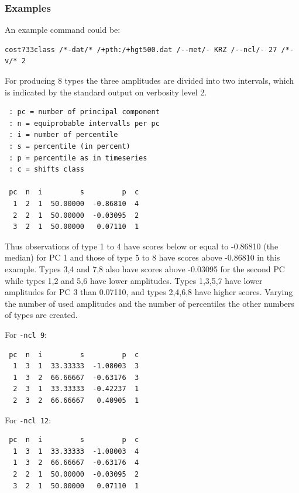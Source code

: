 \documentclass[12pt, oneside, a4paper, headsepline, plainheadsepline]{scrbook}
\begin{document}
\subsubsection*{Examples}
An example command could be:
\begin{lstlisting}
cost733class /*-dat/* /+pth:/+hgt500.dat /--met/- KRZ /--ncl/- 27 /*-v/* 2
\end{lstlisting}

For producing 8 types the three amplitudes are divided into two intervals, which is indicated by the 
standard output on verbosity level 2.

\begin{scriptsize}
\begin{lstlisting}
 : pc = number of principal component
 : n = equiprobable intervalls per pc
 : i = number of percentile
 : s = percentile (in percent)
 : p = percentile as in timeseries
 : c = shifts class

 pc  n  i         s         p  c
  1  2  1  50.00000  -0.86810  4
  2  2  1  50.00000  -0.03095  2
  3  2  1  50.00000   0.07110  1
\end{lstlisting}
\end{scriptsize}

Thus observations of type 1 to 4 have scores below or equal to -0.86810 (the median) for PC 1 and those of type 5 to 8
have scores above -0.86810 in this example. Types 3,4 and 7,8 also have scores above -0.03095 for the second PC 
while types 1,2 and 5,6 have lower amplitudes. Types 1,3,5,7 have lower amplitudes for PC 3 than 0.07110, and
types 2,4,6,8 have higher scores.
Varying the number of used amplitudes and the number of percentiles the other numbers of types are created.

For \verb+-ncl 9+:
\begin{scriptsize}
\begin{lstlisting}
 pc  n  i         s         p  c
  1  3  1  33.33333  -1.08003  3
  1  3  2  66.66667  -0.63176  3
  2  3  1  33.33333  -0.42237  1
  2  3  2  66.66667   0.40905  1
\end{lstlisting}
\end{scriptsize}

For \verb+-ncl 12+:
\begin{scriptsize}
\begin{lstlisting}
 pc  n  i         s         p  c
  1  3  1  33.33333  -1.08003  4
  1  3  2  66.66667  -0.63176  4
  2  2  1  50.00000  -0.03095  2
  3  2  1  50.00000   0.07110  1
\end{lstlisting}
\end{scriptsize}
\end{document}
